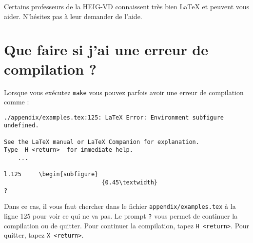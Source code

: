 Certains professeurs de la HEIG-VD connaissent très bien LaTeX et peuvent vous aider. N'hésitez pas à leur demander de l'aide.

\section{Que faire si j'ai une erreur de compilation ?}

Lorsque vous exécutez \verb!make! vous pouvez parfois avoir une erreur de compilation comme :

\begin{verbatim}
./appendix/examples.tex:125: LaTeX Error: Environment subfigure undefined.

See the LaTeX manual or LaTeX Companion for explanation.
Type  H <return>  for immediate help.
    ...

l.125     \begin{subfigure}
                            {0.45\textwidth}
?
\end{verbatim}

Dans ce cas, il vous faut chercher dans le fichier \verb!appendix/examples.tex! à la ligne 125 pour voir ce qui ne va pas. Le prompt \verb!?! vous permet de continuer la compilation ou de quitter. Pour continuer la compilation, tapez \verb!H <return>!. Pour quitter, tapez \verb!X <return>!.